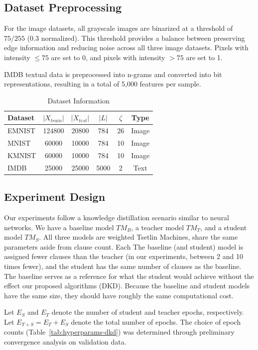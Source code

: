 \documentclass[sn-mathphys-num]{sn-jnl}%
\theoremstyle{thmstyleone}%
\theoremstyle{thmstyletwo}%
\theoremstyle{thmstylethree}%
\begin{document}
\subsection{Dataset Preprocessing}
For the image datasets, all grayscale images are binarized at a threshold of $75/255$ (0.3 normalized). This threshold provides a balance between preserving edge information and reducing noise across all three image datasets. Pixels with intensity $\leq 75$ are set to 0, and pixels with intensity $>75$ are set to 1.

IMDB textual data is preprocessed into n-grams and converted into bit representations, resulting in a total of 5,000 features per sample.

\begin{table}
	\centering
	\caption{Dataset Information}
	\begin{tabular}{|l|c|c|c|c|c|}
		\hline
		Dataset & $|X_{train}|$ & $|X_{test}|$ & $|L|$ & $\zeta$ & Type\\
		\hline
		EMNIST & 124800 & 20800 & 784 & 26 & Image \\\hline
		MNIST & 60000 & 10000 & 784 & 10 & Image \\\hline
		KMNIST & 60000 & 10000 & 784 & 10 & Image \\\hline
		IMDB & 25000 & 25000 & 5000 & 2 & Text \\
		\hline
	\end{tabular}
	\label{tab:dataset-size}
\end{table}

\subsection{Experiment Design}

Our experiments follow a knowledge distillation scenario similar to neural networks. We have a baseline model $TM_B$, a teacher model $TM_T$, and a student model $TM_S$. All three models are weighted Tsetlin Machines, share the same parameters aside from clause count. Each  The baseline (and student) model is assigned fewer clauses than the teacher (in our experiments, between 2 and 10 times fewer), and the student has the same number of clauses as the baseline. The baseline serves as a reference for what the student would achieve without the effect our proposed algorithms (DKD). Because the baseline and student models have the same size, they should have roughly the same computational cost.

Let $E_S$ and $E_T$ denote the number of student and teacher epochs, respectively. Let $E_{T+S} = E_T + E_S$ denote the total number of epochs. The choice of epoch counts (Table~\ref{tab:hyperparams-dkd}) was determined through preliminary convergence analysis on validation data.
\end{document}
